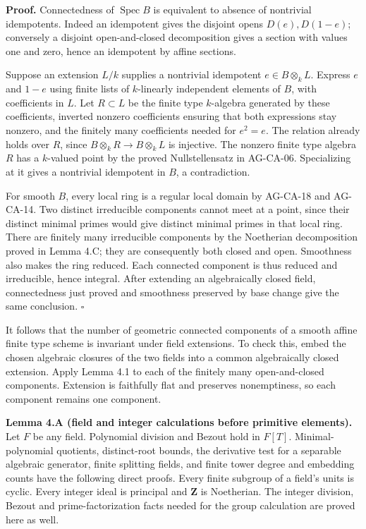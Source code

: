 \documentclass[11pt,a4paper,openany]{report}
\newcounter{none}
\begin{document}
\textbf{Proof.} Connectedness of \(\operatorname{Spec}B\) is equivalent to absence of nontrivial idempotents. Indeed an idempotent gives the disjoint opens \(D(e),D(1-e)\); conversely a disjoint open-and-closed decomposition gives a section with values one and zero, hence an idempotent by affine sections.

Suppose an extension \(L/k\) supplies a nontrivial idempotent \(e\in B\otimes_kL\). Express \(e\) and \(1-e\) using finite lists of \(k\)-linearly independent elements of \(B\), with coefficients in \(L\). Let \(R\subset L\) be the finite type \(k\)-algebra generated by these coefficients, inverted nonzero coefficients ensuring that both expressions stay nonzero, and the finitely many coefficients needed for \(e^2=e\). The relation already holds over \(R\), since \(B\otimes_kR\to B\otimes_kL\) is injective. The nonzero finite type algebra \(R\) has a \(k\)-valued point by the proved Nullstellensatz in AG-CA-06. Specializing at it gives a nontrivial idempotent in \(B\), a contradiction.

For smooth \(B\), every local ring is a regular local domain by AG-CA-18 and AG-CA-14. Two distinct irreducible components cannot meet at a point, since their distinct minimal primes would give distinct minimal primes in that local ring. There are finitely many irreducible components by the Noetherian decomposition proved in Lemma 4.C; they are consequently both closed and open. Smoothness also makes the ring reduced. Each connected component is thus reduced and irreducible, hence integral. After extending an algebraically closed field, connectedness just proved and smoothness preserved by base change give the same conclusion. \(\square\)

It follows that the number of geometric connected components of a smooth affine finite type scheme is invariant under field extensions. To check this, embed the chosen algebraic closures of the two fields into a common algebraically closed extension. Apply Lemma 4.1 to each of the finitely many open-and-closed components. Extension is faithfully flat and preserves nonemptiness, so each component remains one component.

\textbf{Lemma 4.A (field and integer calculations before primitive elements).} Let \(F\) be any field. Polynomial division and Bezout hold in \(F[T]\). Minimal-polynomial quotients, distinct-root bounds, the derivative test for a separable algebraic generator, finite splitting fields, and finite tower degree and embedding counts have the following direct proofs. Every finite subgroup of a field's units is cyclic. Every integer ideal is principal and \(\mathbf Z\) is Noetherian. The integer division, Bezout and prime-factorization facts needed for the group calculation are proved here as well.
\end{document}
